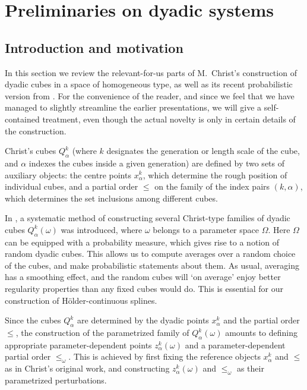 \documentclass{amsart}
\numberwithin{equation}{section}
\theoremstyle{plain}
\theoremstyle{definition}
\theoremstyle{remark}
\begin{document}
{{\section{Preliminaries on dyadic systems}

\subsection*{Introduction and motivation}
In this section we review the relevant-for-us parts of M.~Christ's \cite{Christ} construction of dyadic cubes in a space of homogeneous type, as well as its recent probabilistic version from \cite{HK,HM}. For the convenience of the reader, and since we feel that we have managed to slightly streamline the earlier presentations, we will give a self-contained treatment, even though the actual novelty is only in certain details of the construction.

Christ's cubes $Q^k_\alpha$ (where $k$ designates the generation or length scale of the cube, and $\alpha$ indexes the cubes inside a given generation) are defined by two sets of auxiliary objects: the centre points $x^k_\alpha$, which determine the rough position of individual cubes, and a partial order $\leq$ on the family of the index pairs $(k,\alpha)$, which determines the set inclusions among different cubes.

In \cite{HK,HM}, a systematic method of constructing several Christ-type families of dyadic cubes $Q^k_\alpha(\omega)$ was introduced, where $\omega$ belongs to a parameter space $\Omega$. Here $\Omega$ can be equipped with a probability measure, which gives rise to a notion of random dyadic cubes. This allows us to compute averages over a random choice of the cubes, and make probabilistic statements about them. As usual, averaging has a smoothing effect, and the random cubes will `on average' enjoy better regularity properties than any fixed cubes would do. This is essential for our construction of H\"older-continuous splines.

Since the cubes $Q^k_\alpha$ are determined by the dyadic points $x^k_\alpha$ and the partial order $\leq$, the construction of the parametrized family of $Q^k_\alpha(\omega)$ amounts to defining appropriate parameter-dependent points $z^k_\alpha(\omega)$ and a parameter-dependent partial order $\leq_\omega$. This is achieved by first fixing the reference objects $x^k_\alpha$ and $\leq$ as in Christ's original work, and constructing $z^k_\alpha(\omega)$ and $\leq_\omega$ as their parametrized perturbations.

}}
\end{document}
